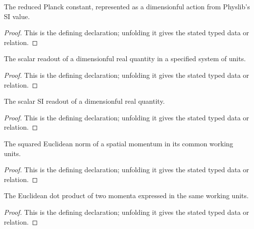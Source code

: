 \begin{definition}[reducedPlanckConstant]
  \label{decl:physics:IPhO_2026_1_C_2:reducedPlanckConstant}
  The reduced Planck constant, represented as a dimensionful action from Physlib's SI value.
\end{definition}
\begin{proof}
  This is the defining declaration; unfolding it gives the stated typed data or relation.
\end{proof}

\begin{definition}[scalarInUnits]
  \label{decl:physics:IPhO_2026_1_C_2:scalarInUnits}
  The scalar readout of a dimensionful real quantity in a specified system of units.
\end{definition}
\begin{proof}
  This is the defining declaration; unfolding it gives the stated typed data or relation.
\end{proof}

\begin{definition}[siScalar]
  \label{decl:physics:IPhO_2026_1_C_2:siScalar}
  The scalar SI readout of a dimensionful real quantity.
\end{definition}
\begin{proof}
  This is the defining declaration; unfolding it gives the stated typed data or relation.
\end{proof}

\begin{definition}[momentumSquaredNorm]
  \label{decl:physics:IPhO_2026_1_C_2:momentumSquaredNorm}
  The squared Euclidean norm of a spatial momentum in its common working units.
\end{definition}
\begin{proof}
  This is the defining declaration; unfolding it gives the stated typed data or relation.
\end{proof}

\begin{definition}[momentumDot]
  \label{decl:physics:IPhO_2026_1_C_2:momentumDot}
  The Euclidean dot product of two momenta expressed in the same working units.
\end{definition}
\begin{proof}
  This is the defining declaration; unfolding it gives the stated typed data or relation.
\end{proof}

